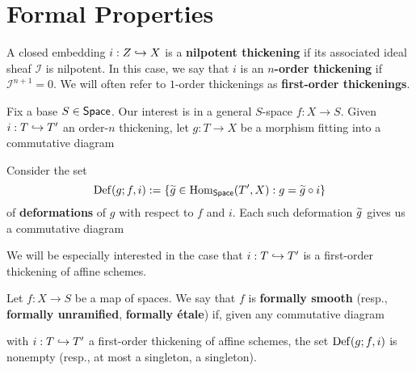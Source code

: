 \documentclass[11pt]{article}
\newcommand{\I}{\mathcal{I}}
\begin{document}
\section{Formal Properties}
\begin{definition}
A closed embedding $i: Z\hookrightarrow X$ is a \textbf{nilpotent thickening} if its associated ideal sheaf $\I$ is nilpotent. In this case, we say that $i$ is an \textbf{$n$-order thickening} if $\I^{n+1}=0$. We will often refer to $1$-order thickenings as \textbf{first-order thickenings}.
\end{definition}

Fix a base $S\in\operatorname{\mathsf{Space}}$. Our interest is in a general $S$-space $f: X\to S$. Given $i: T\hookrightarrow T'$ an order-$n$ thickening, let $g: T\to X$ be a morphism fitting into a commutative diagram
\begin{center}
\end{center}
Consider the set
$$\operatorname{Def}(g;f,i):=\{\widetilde{g}\in\operatorname{Hom}_{\operatorname{\mathsf{Space}}}(T',X) : g=\widetilde{g}\circ i\}$$
of \textbf{deformations} of $g$ with respect to $f$ and $i$. Each such deformation $\widetilde{g}$ gives us a commutative diagram
\begin{center}
\end{center}
We will be especially interested in the case that $i: T\hookrightarrow T'$ is a first-order thickening of affine schemes. 

\begin{definition}
Let $f: X\to S$ be a map of spaces. We say that $f$ is \textbf{formally smooth} (resp., \textbf{formally unramified}, \textbf{formally \'{e}tale}) if, given any commutative diagram 
\begin{center}
\end{center}
with $i: T\hookrightarrow T'$ a first-order thickening of affine schemes, the set $\operatorname{Def}(g;f,i)$ is nonempty (resp., at most a singleton, a singleton).
\end{definition}
\end{document}
